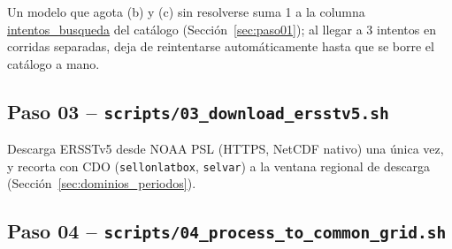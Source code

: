 \documentclass[11pt,a4paper]{article}
\newcommand{\archivo}[1]{\begingroup\hypersetup{urlcolor=black}\url{#1}\endgroup}
\begin{document}
Un modelo que agota (b) y (c) sin resolverse suma 1 a la columna \archivo{intentos_busqueda} del cat\'alogo (Secci\'on~\ref{sec:paso01}); al llegar a 3 intentos en corridas separadas, deja de reintentarse autom\'aticamente hasta que se borre el cat\'alogo a mano.

\subsection{Paso 03 -- \texttt{scripts/03\_download\_ersstv5.sh}}
Descarga ERSSTv5 desde NOAA PSL (HTTPS, NetCDF nativo) una \'unica vez, y recorta con CDO (\texttt{sellonlatbox}, \texttt{selvar}) a la ventana regional de descarga (Secci\'on~\ref{sec:dominios_periodos}).

\subsection{Paso 04 -- \texttt{scripts/04\_process\_to\_common\_grid.sh}}
\label{sec:paso04}
\end{document}
